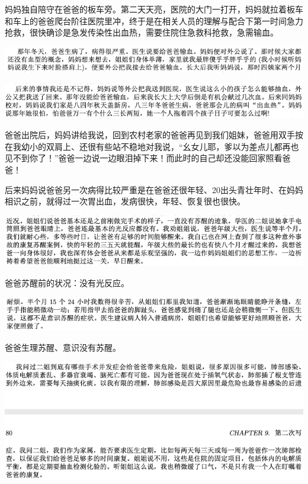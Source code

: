 \documentclass[9pt, b5paper]{article}
\begin{document}
妈妈独自陪守在爸爸的板车旁。第二天天亮，医院的大门一打开，妈妈就拉着板车和车上的爸爸爬台阶往医院里冲，终于是在相关人员的理解与配合下第一时间急力抢救，很快确诊是急发传染性出血热，需要住院住急救科抢救，急需输血。

\begin{center}
\includegraphics[width=.9\linewidth]{./pic/backups_plans_20210417_104907.png}
\end{center}

\begin{center}
\includegraphics[width=.9\linewidth]{./pic/backups_plans_20210417_104955.png}
\end{center}

爸爸出院后，妈妈讲给我说，回到农村老家的爸爸再见到我们姐妹，爸爸用双手按在我幼小的双肩上、还很有些站不稳地对我说，“幺女儿耶，爹以为差点儿都再也见不到你了！”爸爸一边说一边眼泪掉下来！而此时的自己却还没能回家照看爸爸！

后来妈妈说爸爸另一次病得比较严重是在爸爸还很年轻、20出头青壮年时、在妈妈相识之前，就得过一次胃出血，发病很快，年轻、恢复很也很快。 

\begin{center}
\includegraphics[width=.9\linewidth]{./pic/backups_plans_20210416_161016.png}
\end{center}

爸爸苏醒前的状况：没有光反应。

\begin{center}
\includegraphics[width=.9\linewidth]{./pic/backups_plans_20210416_161213.png}
\end{center}

爸爸生理苏醒、意识没有苏醒。

\begin{center}
\includegraphics[width=.9\linewidth]{./pic/backups_plans_20210416_161400.png}
\end{center}
\end{document}
